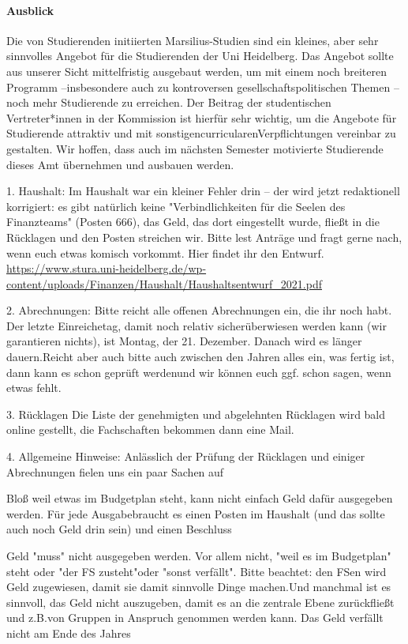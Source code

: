 \paragraph{Ausblick}
Die von Studierenden initiierten Marsilius-Studien sind ein kleines, aber sehr sinnvolles Angebot für die Studierenden der Uni Heidelberg. Das Angebot sollte aus unserer Sicht mittelfristig ausgebaut werden,  um  mit  einem  noch  breiteren  Programm –insbesondere  auch  zu  kontroversen  gesellschaftspolitischen  Themen –noch  mehr  Studierende  zu  erreichen.  Der  Beitrag  der  studentischen Vertreter*innen  in  der  Kommission  ist  hierfür  sehr  wichtig,  um  die  Angebote  für  Studierende  attraktiv und mit sonstigencurricularenVerpflichtungen vereinbar zu gestalten. Wir hoffen, dass auch im nächsten Semester motivierte Studierende dieses Amt übernehmen und ausbauen werden.

1. Haushalt:
Im Haushalt war ein kleiner Fehler drin -- der wird jetzt redaktionell korrigiert: es gibt natürlich keine "Verbindlichkeiten für die Seelen des Finanzteams" (Posten 666), das Geld, das dort eingestellt wurde, fließt in die Rücklagen und den Posten streichen wir. Bitte lest Anträge und fragt gerne nach, wenn euch etwas komisch vorkommt. Hier findet ihr den Entwurf.
\url{https://www.stura.uni-heidelberg.de/wp-content/uploads/Finanzen/Haushalt/Haushaltsentwurf_2021.pdf}

2. Abrechnungen:
Bitte reicht alle offenen Abrechnungen ein, die ihr noch habt. Der letzte Einreichetag, damit noch relativ sicherüberwiesen werden kann (wir garantieren nichts), ist Montag, der 21. Dezember. Danach wird es länger dauern.Reicht aber auch bitte auch zwischen den Jahren alles ein, was fertig ist, dann kann es schon geprüft werdenund wir können euch ggf. schon sagen, wenn etwas fehlt.

3. Rücklagen
Die Liste der genehmigten und abgelehnten Rücklagen wird bald online gestellt, die Fachschaften bekommen dann eine Mail.

4. Allgemeine Hinweise:
Anlässlich der Prüfung der Rücklagen und einiger Abrechnungen fielen uns ein paar Sachen auf

    Bloß weil etwas im Budgetplan steht, kann nicht einfach Geld dafür ausgegeben werden. Für jede Ausgabebraucht es einen Posten im Haushalt (und das sollte auch noch Geld drin sein) und einen Beschluss

    Geld "muss" nicht ausgegeben werden. Vor allem nicht, "weil es im Budgetplan" steht oder "der FS zusteht"oder "sonst verfällt". Bitte beachtet: den FSen wird Geld zugewiesen, damit sie damit sinnvolle Dinge machen.Und manchmal ist es sinnvoll, das Geld nicht auszugeben, damit es an die zentrale Ebene zurückfließt und z.B.von Gruppen in Anspruch genommen werden kann. Das Geld verfällt nicht am Ende des Jahres

